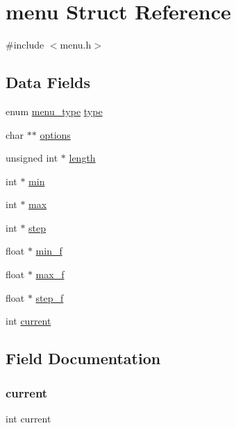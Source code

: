 \hypertarget{structmenu}{}\section{menu Struct Reference}
\label{structmenu}


{\ttfamily \#include $<$menu.\+h$>$}

\subsection*{Data Fields}
\begin{DoxyCompactItemize}
\item 
enum \hyperlink{menu_8h_a6bbf4baf5018b0d76aab6c2e6bf85e62}{menu\+\_\+type} \hyperlink{structmenu_ae131df142b529116ec8300a3c59b14be}{type}
\item 
char $\ast$$\ast$ \hyperlink{structmenu_afefe8f715b91a6c68097ec7503dd6020}{options}
\item 
unsigned int $\ast$ \hyperlink{structmenu_ad42d625fa749b07c73c9ae28ea4c3bd2}{length}
\item 
int $\ast$ \hyperlink{structmenu_aea9f5a2490568cd16f46c29df1106fc1}{min}
\item 
int $\ast$ \hyperlink{structmenu_a0cfebdbd2ba1d9ae782a6cd77f734e9e}{max}
\item 
int $\ast$ \hyperlink{structmenu_a985265c90800ba09664f71e134dd5786}{step}
\item 
float $\ast$ \hyperlink{structmenu_a52d27cf45e46c52138c1a6bc4e46773d}{min\+\_\+f}
\item 
float $\ast$ \hyperlink{structmenu_a70e64637ad619d8d1f0bca19af45f169}{max\+\_\+f}
\item 
float $\ast$ \hyperlink{structmenu_ad30508910252066b5c8e1c574080b736}{step\+\_\+f}
\item 
int \hyperlink{structmenu_ab04e2d55ea4a544f3575812582af7b51}{current}
\end{DoxyCompactItemize}


\subsection{Field Documentation}
\mbox{\label{structmenu_ab04e2d55ea4a544f3575812582af7b51}} 
\subsubsection{\texorpdfstring{current}{current}}
{\footnotesize\ttfamily int current}

